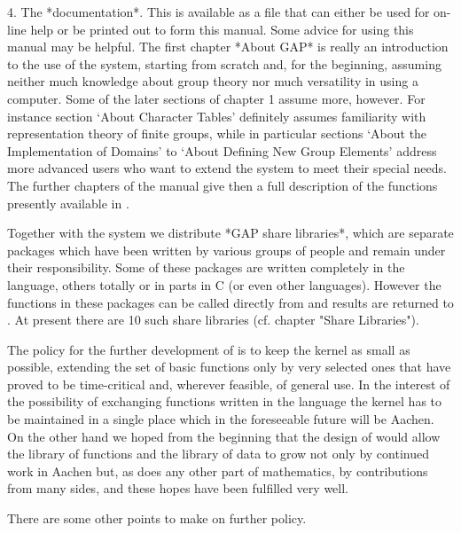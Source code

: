   \item{4.}
    The *documentation*.  This is available as  a file that can either be
    used for on-line  help or be printed  out to form  this manual.  Some
    advice for  using this manual   may  be helpful.   The first  chapter
    *About GAP* is   really an introduction  to  the use  of the  system,
    starting from  scratch and, for the  beginning, assuming neither much
    knowledge  about group  theory   nor  much versatility  in   using  a
    computer.   Some  of  the later sections  of  chapter  1 assume more,
    however.  For   instance section `About Character  Tables' definitely
    assumes  familiarity  with representation   theory of  finite groups,
    while in particular sections `About the Implementation of Domains' to
    `About  Defining New Group Elements'  address more advanced users who
    want to extend  the system to meet their  special needs.  The further
    chapters of the manual give then a  full description of the functions
    presently available in {\GAP}.
\endlist

Together with the  system we distribute *GAP  share libraries*, which are
separate packages which have been written by various groups of people and
remain   under their responsibility.  Some  of these packages are written
completely in the  {\GAP} language, others totally or  in parts in C  (or
even  other languages). However  the  functions in these  packages can be
called  directly from   {\GAP}  and results are   returned  to {\GAP}. At
present   there   are  10  such  share    libraries  (cf. chapter  "Share
Libraries").

The policy for the further development of {\GAP} is to keep the kernel as
small  as possible,  extending  the set  of basic functions  only by very
selected   ones that  have  proved  to   be  time-critical and,  wherever
feasible,  of  general use.    In  the interest  of the    possibility of
exchanging functions written in the {\GAP} language the  kernel has to be
maintained in  a  single place  which in  the foreseeable  future will be
Aachen.  On the other hand we hoped from the beginning that the design of
{\GAP} would  allow the library  of {\GAP} functions   and the library of
data to grow not only by continued work in Aachen  but, as does any other
part of mathematics, by contributions  from  many sides, and these  hopes
have been fulfilled very well.

There are some other points to make on further policy.

